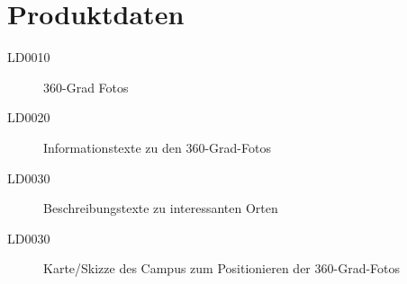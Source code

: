 \section{Produktdaten}
\label{sec:Produktdaten}

\begin{description}
  \item[LD0010] 360-Grad Fotos
  \item[LD0020] Informationstexte zu den 360-Grad-Fotos
  \item[LD0030] Beschreibungstexte zu interessanten Orten
  \item[LD0030] Karte/Skizze des Campus zum Positionieren der 360-Grad-Fotos
\end{description}